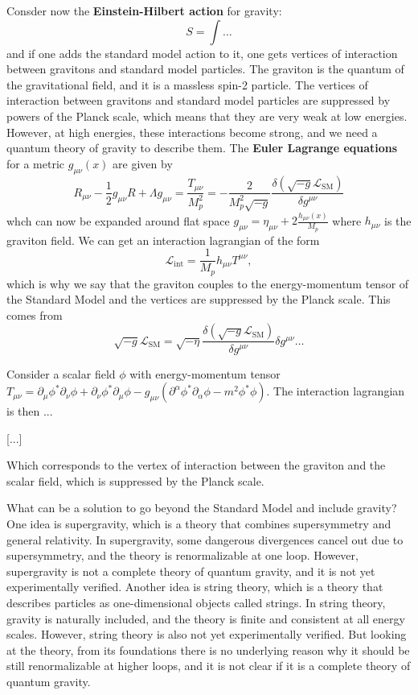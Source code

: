 Consder now the \textbf{Einstein-Hilbert action} for gravity:
\[
    S = \int \dots
\]
and if one adds the standard model action to it, one gets vertices of interaction between gravitons and standard model particles. The graviton is the quantum of the gravitational field, and it is a massless spin-2 particle. The vertices of interaction between gravitons and standard model particles are suppressed by powers of the Planck scale, which means that they are very weak at low energies. However, at high energies, these interactions become strong, and we need a quantum theory of gravity to describe them. The \textbf{Euler Lagrange equations} for a metric \(g_{\mu\nu}(x)\) are given by
\[
    R_{\mu\nu} - \frac{1}{2}g_{\mu\nu}R + \Lambda g_{\mu\nu} = \frac{T_{\mu\nu}}{M_p^2} = -\frac{2}{M_p^2 \sqrt{-g}}\frac{\delta (\sqrt{-g} \mathcal{L}_{\text{SM}})}{\delta g^{\mu\nu}}
\]
whch can now be expanded around flat space \(g_{\mu\nu} = \eta_{\mu\nu} + 2\frac{h_{\mu\nu}(x)}{M_p}\) where \(h_{\mu\nu}\) is the graviton field. We can get an interaction lagrangian of the form
\[
    \mathcal{L}_{\text{int}} = \frac{1}{M_p}h_{\mu\nu}T^{\mu\nu},
\]
which is why we say that the graviton couples to the energy-momentum tensor of the Standard Model and the vertices are suppressed by the Planck scale. This comes from
\[
    \sqrt{-g} \mathcal{L}_{\text{SM}} = \sqrt{-\eta} \frac{\delta (\sqrt{-g} \mathcal{L}_{\text{SM}})}{\delta g^{\mu\nu}} \delta g^{\mu\nu}\dots
\]
\begin{example}
    Consider a scalar field \(\phi\) with energy-momentum tensor \(T_{\mu\nu} = \partial_\mu \phi^* \partial_\nu \phi + \partial_\nu \phi^* \partial_\mu \phi - g_{\mu\nu}(\partial^\alpha \phi^* \partial_\alpha \phi - m^2 \phi^* \phi)\). The interaction lagrangian is then ...

        [...]

    Which corresponds to the vertex of interaction between the graviton and the scalar field, which is suppressed by the Planck scale.
\end{example}

What can be a solution to go beyond the Standard Model and include gravity? One idea is supergravity, which is a theory that combines supersymmetry and general relativity. In supergravity, some dangerous divergences cancel out due to supersymmetry, and the theory is renormalizable at one loop. However, supergravity is not a complete theory of quantum gravity, and it is not yet experimentally verified. Another idea is string theory, which is a theory that describes particles as one-dimensional objects called strings. In string theory, gravity is naturally included, and the theory is finite and consistent at all energy scales. However, string theory is also not yet experimentally verified. But looking at the theory, from its foundations there is no underlying reason why it should be still renormalizable at higher loops, and it is not clear if it is a complete theory of quantum gravity.

